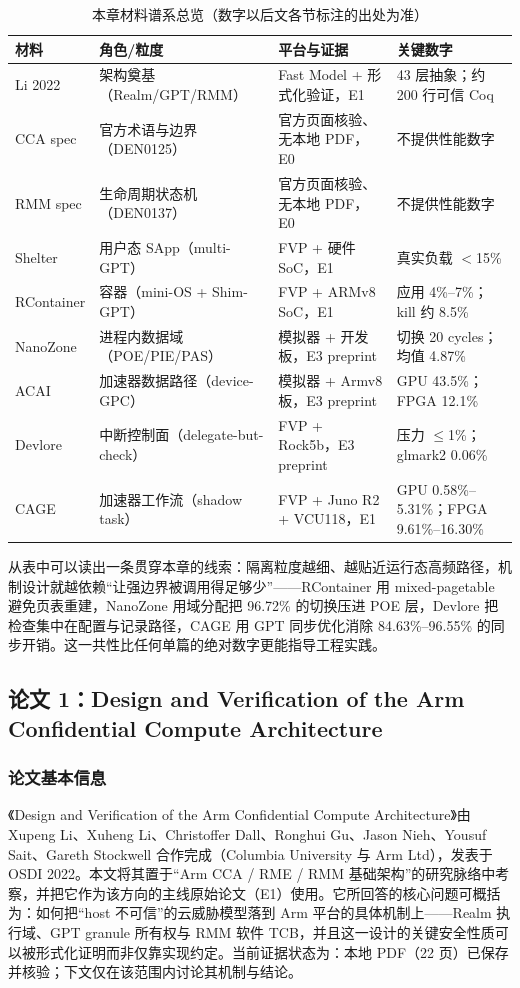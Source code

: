 \documentclass[11pt]{ctexart}
\begin{document}
\begin{table}[htbp]
\centering\small
\caption{本章材料谱系总览（数字以后文各节标注的出处为准）}
\begin{tabular}{llll}
\toprule
材料 & 角色/粒度 & 平台与证据 & 关键数字 \\
\midrule
Li 2022\cite{li2022cca} & 架构奠基（Realm/GPT/RMM） & Fast Model + 形式化验证，E1 & 43 层抽象；约 200 行可信 Coq \\
CCA spec\cite{arm_cca_spec} & 官方术语与边界（DEN0125） & 官方页面核验、无本地 PDF，E0 & 不提供性能数字 \\
RMM spec\cite{arm_rmm_spec} & 生命周期状态机（DEN0137） & 官方页面核验、无本地 PDF，E0 & 不提供性能数字 \\
Shelter\cite{zhang2023shelter} & 用户态 SApp（multi-GPT） & FVP + 硬件 SoC，E1 & 真实负载 $<$15\% \\
RContainer\cite{zhou2025rcontainer} & 容器（mini-OS + Shim-GPT） & FVP + ARMv8 SoC，E1 & 应用 4\%--7\%；kill 约 8.5\% \\
NanoZone\cite{liu2025nanozone} & 进程内数据域（POE/PIE/PAS） & 模拟器 + 开发板，E3 preprint & 切换 20 cycles；均值 4.87\% \\
ACAI\cite{acai2023} & 加速器数据路径（device-GPC） & 模拟器 + Armv8 板，E3 preprint & GPU 43.5\%；FPGA 12.1\% \\
Devlore\cite{bertschi2026devlore} & 中断控制面（delegate-but-check） & FVP + Rock5b，E3 preprint & 压力 $\le$1\%；glmark2 0.06\% \\
CAGE\cite{wang2026cage} & 加速器工作流（shadow task） & FVP + Juno R2 + VCU118，E1 & GPU 0.58\%--5.31\%；FPGA 9.61\%--16.30\% \\
\bottomrule
\end{tabular}
\end{table}
从表中可以读出一条贯穿本章的线索：隔离粒度越细、越贴近运行态高频路径，机制设计就越依赖“让强边界被调用得足够少”——RContainer 用 mixed-pagetable 避免页表重建，NanoZone 用域分配把 96.72\% 的切换压进 POE 层，Devlore 把检查集中在配置与记录路径，CAGE 用 GPT 同步优化消除 84.63\%--96.55\% 的同步开销。这一共性比任何单篇的绝对数字更能指导工程实践。\par

\subsection{论文 1：Design and Verification of the Arm Confidential Compute Architecture}
\subsubsection{论文基本信息}
《Design and Verification of the Arm Confidential Compute Architecture》由 Xupeng Li、Xuheng Li、Christoffer Dall、Ronghui Gu、Jason Nieh、Yousuf Sait、Gareth Stockwell 合作完成（Columbia University 与 Arm Ltd），发表于 OSDI 2022。本文将其置于“Arm CCA / RME / RMM 基础架构”的研究脉络中考察，并把它作为该方向的主线原始论文（E1）使用。它所回答的核心问题可概括为：如何把“host 不可信”的云威胁模型落到 Arm 平台的具体机制上——Realm 执行域、GPT granule 所有权与 RMM 软件 TCB，并且这一设计的关键安全性质可以被形式化证明而非仅靠实现约定。当前证据状态为：本地 PDF（22 页）已保存并核验；下文仅在该范围内讨论其机制与结论。\cite{li2022cca}\par
\end{document}
